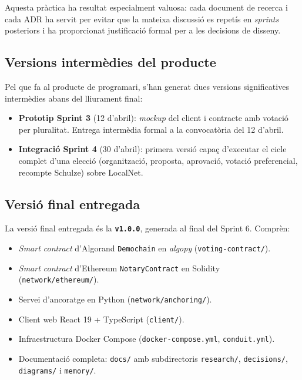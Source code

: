 Aquesta pràctica ha resultat especialment valuosa: cada document de
recerca i cada \ac{ADR} ha servit per evitar que la mateixa discussió
es repetís en \emph{sprints} posteriors i ha proporcionat justificació
formal per a les decisions de disseny.

\subsection{Versions intermèdies del producte}

Pel que fa al producte de programari, s'han generat dues versions
significatives intermèdies abans del lliurament final:

\begin{itemize}
    \item \textbf{Prototip Sprint 3} (12 d'abril): \emph{mockup} del
    client i contracte amb votació per pluralitat. Entrega intermèdia
    formal a la convocatòria del 12 d'abril.
    \item \textbf{Integració Sprint 4} (30 d'abril): primera versió
    capaç d'executar el cicle complet d'una elecció (organització,
    proposta, aprovació, votació preferencial, recompte Schulze) sobre
    LocalNet.
\end{itemize}

\subsection{Versió final entregada}

La versió final entregada és la \textbf{\texttt{v1.0.0}}, generada al
final del Sprint 6. Comprèn:

\begin{itemize}
    \item \emph{Smart contract} d'Algorand \texttt{Demochain} en
    \emph{algopy} (\texttt{voting-contract/}).
    \item \emph{Smart contract} d'Ethereum \texttt{NotaryContract} en
    Solidity (\texttt{network/ethereum/}).
    \item Servei d'ancoratge en Python (\texttt{network/anchoring/}).
    \item Client web React 19 + TypeScript (\texttt{client/}).
    \item Infraestructura Docker Compose (\texttt{docker-compose.yml},
    \texttt{conduit.yml}).
    \item Documentació completa: \texttt{docs/} amb subdirectoris
    \texttt{research/}, \texttt{decisions/}, \texttt{diagrams/} i
    \texttt{memory/}.
\end{itemize}

